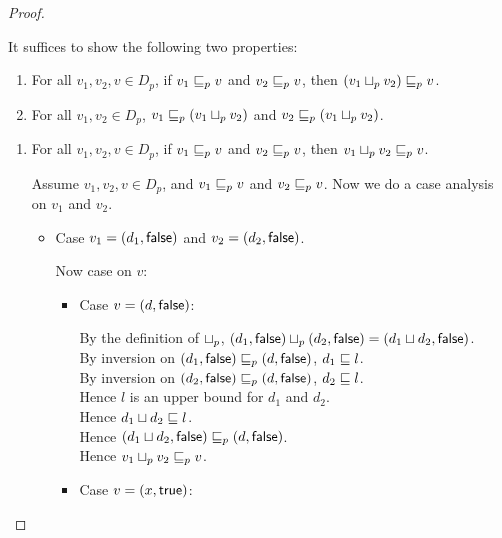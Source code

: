 \begin{proof}
\begin{enumerate}

It suffices to show the following two properties:
  \begin{enumerate}
  \item For all $v_1, v_2, v \in D_p$, if $v_1 \sqsubseteq_p v$ and $v_2 \sqsubseteq_p v$, then $(v_1 \sqcup_p v_2) \sqsubseteq_p v$.
  \item For all $v_1, v_2 \in D_p$, $v_1 \sqsubseteq_p (v_1 \sqcup_p v_2)$ and $v_2 \sqsubseteq_p (v_1 \sqcup_p v_2)$. 
  \end{enumerate}
  \begin{enumerate}
  \item For all $v_1, v_2, v \in D_p$, if $v_1 \sqsubseteq_p v$ and $v_2 \sqsubseteq_p v$, then $v_1 \sqcup_p v_2 \sqsubseteq_p v$.
    
   Assume $v_1, v_2, v \in D_p$, and $v_1 \sqsubseteq_p v$ and $v_2 \sqsubseteq_p v$. Now we do a case analysis on 
   $v_1$ and $v_2$. 
   \begin{itemize}
   \item Case $v_1 = (d_1, \textsf{false})$ and $v_2 = (d_2, \textsf{false})$. 
  
     Now case on $v$: 
     \begin{itemize}
     \item Case $v = (d, \textsf{false})$: 
  
       By the definition of $ \sqcup_p $, $(d_1, \textsf{false}) \sqcup_p (d_2, \textsf{false}) = (d_1 \sqcup d_2, \textsf{false})$. \\ 
       By inversion on $(d_1, \textsf{false}) \sqsubseteq_p (d, \textsf{false})$,  $d_1 \sqsubseteq l$. \\
       By inversion on $(d_2, \textsf{false}) \sqsubseteq_p (d, \textsf{false})$,  $d_2 \sqsubseteq l$. \\
       Hence $l$ is an upper bound for $d_1$ and $d_2$. \\ 
       Hence $d_1 \sqcup d_2 \sqsubseteq l$. \\ 
       Hence $(d_1 \sqcup d_2, \textsf{false}) \sqsubseteq_p (d, \textsf{false})$. \\ 
       Hence $v_1 \sqcup_p v_2 \sqsubseteq_p v$. 
  
     \item Case $v = (x, \textsf{true})$: 
  

\end{itemize}
\end{itemize}
\end{enumerate}
\end{enumerate}
\end{proof}
